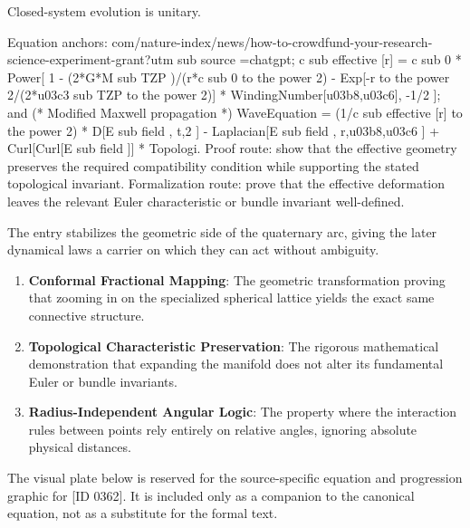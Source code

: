 Closed-system evolution is unitary.

Equation anchors: com/nature-index/news/how-to-crowdfund-your-research-science-experiment-grant?utm sub source =chatgpt; c sub effective [r] = c sub 0 * Power[ 1 - (2*G*M sub TZP )/(r*c sub 0 to the power 2) - Exp[-r to the power 2/(2*u03c3 sub TZP to the power 2)] * WindingNumber[u03b8,u03c6], -1/2 ]; and (* Modified Maxwell propagation *) WaveEquation = (1/c sub effective [r] to the power 2) * D[E sub field , t,2 ] - Laplacian[E sub field , r,u03b8,u03c6 ] + Curl[Curl[E sub field ]] * Topologi. Proof route: show that the effective geometry preserves the required compatibility condition while supporting the stated topological invariant. Formalization route: prove that the effective deformation leaves the relevant Euler characteristic or bundle invariant well-defined.

The entry stabilizes the geometric side of the quaternary arc, giving the later dynamical laws a carrier on which they can act without ambiguity.
\endgroup

\begin{enumerate}[leftmargin=1.6em,itemsep=6pt,topsep=4pt]
\item \textbf{Conformal Fractional Mapping}: The geometric transformation proving that zooming in on the specialized spherical lattice yields the exact same connective structure.
\item \textbf{Topological Characteristic Preservation}: The rigorous mathematical demonstration that expanding the manifold does not alter its fundamental Euler or bundle invariants.
\item \textbf{Radius-Independent Angular Logic}: The property where the interaction rules between points rely entirely on relative angles, ignoring absolute physical distances.
\end{enumerate}

\begingroup\footnotesize\sloppy
The visual plate below is reserved for the source-specific equation and progression graphic for [ID 0362]. It is included only as a companion to the canonical equation, not as a substitute for the formal text.
\par\endgroup
\ifTZPDarkEdition
{}
\fi

